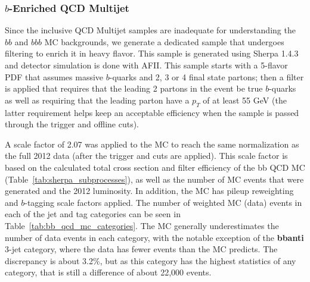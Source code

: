 \subsubsection{$b$-Enriched QCD Multijet}
\label{sec:bb_qcd_mc}
Since the inclusive QCD Multijet samples are inadequate for understanding the $bb$ and 
$bbb$ MC backgrounds, we generate a dedicated sample that undergoes filtering to 
enrich it in heavy flavor.  This sample is generated using Sherpa 1.4.3 
\cite{Sherpa} and detector simulation is done with AFII.  This sample 
starts with a 5-flavor PDF that assumes massive $b$-quarks and 
2, 3 or 4 final state partons; then a filter is applied that 
requires that the leading 2 partons in the event be true $b$-quarks 
as well as requiring that the leading parton have a $p_T$ 
of at least 55 GeV (the latter requirement helps keep an acceptable efficiency when 
the sample is passed through the trigger and offline cuts).

A scale factor of 2.07 was applied to the MC to  
reach the same normalization as the full 2012 data (after the trigger and cuts are 
applied).  This scale factor is based on the calculated total cross section and
filter efficiency of the bb QCD MC (Table~\ref{tab:sherpa_subprocesses}), as well
as the number of MC events that were generated and the 2012 luminosity. 
In addition, the MC has pileup reweighting and $b$-tagging scale factors
applied.  The number of weighted MC (data) events in each of the jet and tag
categories can be seen in Table~\ref{tab:bb_qcd_mc_categories}.  The MC
generally underestimates the number of data events in each category,
with the notable exception of the \textbf{bbanti} 3-jet category, where 
the data has fewer events than the MC predicts.  The discrepancy is about
3.2\%, but as this category has the highest statistics of any category,
that is still a difference of about 22,000 events.

